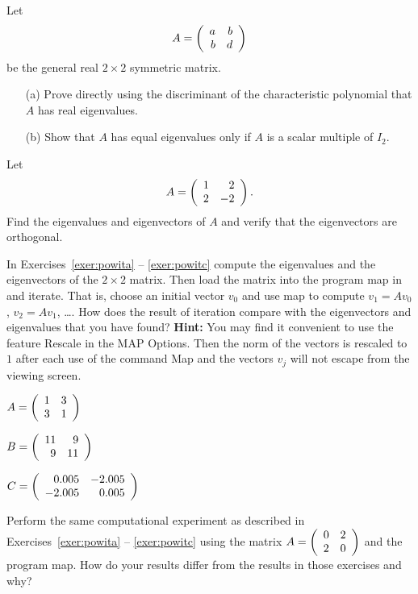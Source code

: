 \EXER

\TEXER

\begin{exercise} \label{c7.7.1}
Let
\[
A = \left(\begin{array}{rr} a & b\\ b &d\end{array}\right)
\]
be the general real $2\times 2$ symmetric matrix.
\begin{itemize}
\item[(a)]  Prove directly using the discriminant of the characteristic
polynomial that $A$ has real eigenvalues.
\item[(b)]  Show that $A$ has equal eigenvalues only if $A$ is a scalar
multiple of $I_2$.
\end{itemize}
\end{exercise}

\begin{exercise} \label{c7.7.2}
Let
\[
A=\left(\begin{array}{rr} 1 & 2\\ 2 &-2\end{array}\right).
\]
Find the eigenvalues and eigenvectors of $A$ and verify that the eigenvectors
are orthogonal.
\end{exercise}

\CEXER

\noindent In Exercises~\ref{exer:powita} -- \ref{exer:powitc}
compute the eigenvalues and the eigenvectors of the 
$2\times 2$ matrix.  Then load the matrix into the program {\sf map}
 in \Matlab and iterate.  That is, choose an initial
vector $v_0$ and use {\sf map} to compute $v_1=Av_0$, $v_2=Av_1$, \ldots.
How does the result of iteration compare with the eigenvectors and
eigenvalues that you have found?
{\bf Hint:} You may find it convenient to use the feature {\sf Rescale} in
the {\sf MAP Options}.  Then the norm of the vectors is rescaled to $1$
after each use of the command {\sf Map} and the vectors $v_j$ will not
escape from the viewing screen.
\begin{exercise}  \label{exer:powita}
$A=\left(\begin{array}{rr} 1 & 3\\ 3 &1\end{array}\right)$
\end{exercise}
\begin{exercise}  \label{exer:powitb}
$B=\left(\begin{array}{rr} 11 & 9\\ 9 &11\end{array}\right)$
\end{exercise}
\begin{exercise}  \label{exer:powitc}
$C=\left(\begin{array}{rr} 0.005 & -2.005\\ -2.005 &0.005\end{array}\right)$
\end{exercise}

\begin{exercise} \label{c7.7.3}
Perform the same computational experiment as described in
Exercises~\ref{exer:powita} -- \ref{exer:powitc} using the matrix
$A=\left(\begin{array}{rr} 0 & 2\\ 2 &0\end{array}\right)$
and the program {\sf map}.  How do your results differ from the results
in those exercises and why?
\end{exercise}



